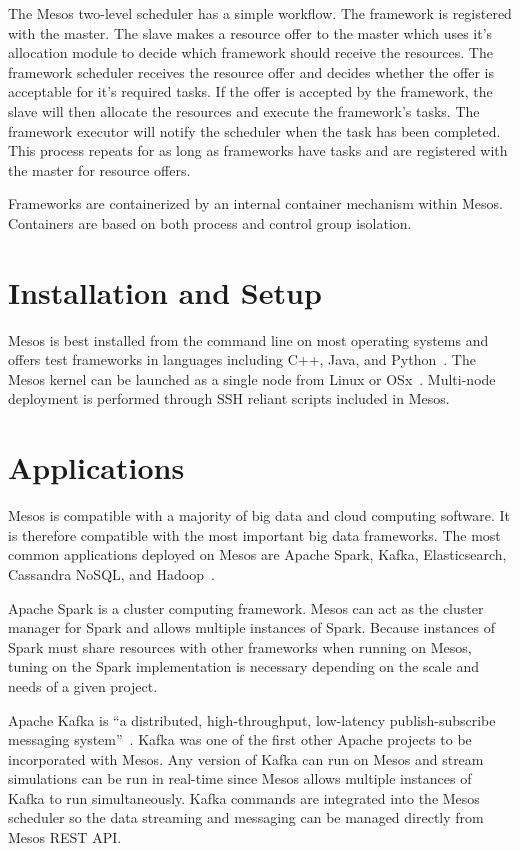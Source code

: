 The Mesos two-level scheduler has a simple workflow. The framework is registered with the master. The slave makes a resource offer to the master which uses it's allocation module to decide which framework should receive the resources. The framework scheduler receives the resource offer and decides whether the offer is acceptable for it's required tasks. If the offer is accepted by the framework, the slave will then allocate the resources and execute the framework's tasks. The framework executor will notify the scheduler when the task has been completed. This process repeats for as long as frameworks have tasks and are registered with the master for resource offers. 

Frameworks are containerized by an internal container mechanism within Mesos. Containers are based on both process and control group isolation. 

\section{Installation and Setup}
Mesos is best installed from the command line on most operating systems and offers test frameworks in languages including C++, Java, and Python~\cite{Kakadia2015}. The Mesos kernel can be launched as a single node from Linux or OSx~\cite{Kakadia2015}. Multi-node deployment is performed through SSH reliant scripts included in Mesos. 


\section{Applications}

Mesos is compatible with a majority of big data and cloud computing software. It is therefore compatible with the most important big data frameworks. The most common applications deployed on Mesos are Apache Spark, Kafka, Elasticsearch, Cassandra NoSQL, and Hadoop~\cite{Yegulalp2016}. 

Apache Spark is a cluster computing framework. Mesos can act as the cluster manager for Spark and allows multiple instances of Spark. Because instances of Spark must share resources with other frameworks when running on Mesos, tuning on the Spark implementation is necessary depending on the scale and needs of a given project. 

Apache Kafka is ``a distributed, high-throughput, low-latency publish-subscribe messaging system''~\cite{Narkhede2015}. Kafka was one of the first other Apache projects to be incorporated with Mesos. Any version of Kafka can run on Mesos and stream simulations can be run in real-time since Mesos allows multiple instances of Kafka to run simultaneously. Kafka commands are integrated into the Mesos scheduler so the data streaming and messaging can be managed directly from Mesos REST API. 

